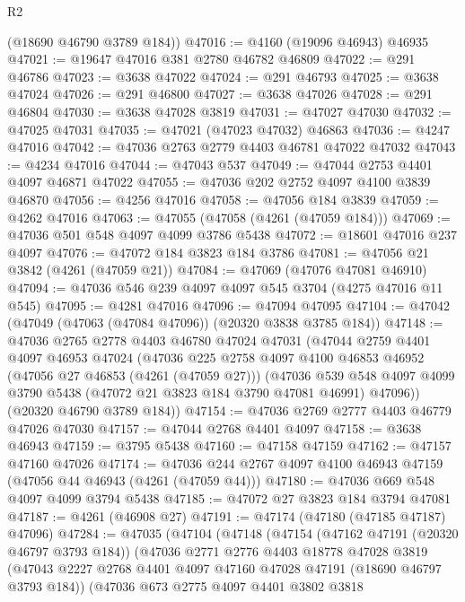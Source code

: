 \begin{lexlean}{R2}
\begin{coremodule}
      (@18690 @46790 @3789 @184))
@47016 := @4160 (@19096 @46943) @46935
@47021 := @19647 @47016 @381 @2780 @46782 @46809
@47022 := @291 @46786
@47023 := @3638 @47022
@47024 := @291 @46793
@47025 := @3638 @47024
@47026 := @291 @46800
@47027 := @3638 @47026
@47028 := @291 @46804
@47030 := @3638 @47028 @3819
@47031 := @47027 @47030
@47032 := @47025 @47031
@47035 := @47021 (@47023 @47032) @46863
@47036 := @4247 @47016
@47042 := @47036 @2763 @2779 @4403 @46781 @47022 @47032
@47043 := @4234 @47016
@47044 := @47043 @537
@47049 := @47044 @2753 @4401 @4097 @46871 @47022
@47055 := @47036 @202 @2752 @4097 @4100 @3839 @46870
@47056 := @4256 @47016
@47058 := @47056 @184 @3839
@47059 := @4262 @47016
@47063 := @47055 (@47058 (@4261 (@47059 @184)))
@47069 := @47036 @501 @548 @4097 @4099 @3786 @5438
@47072 := @18601 @47016 @237 @4097
@47076 := @47072 @184 @3823 @184 @3786
@47081 := @47056 @21 @3842 (@4261 (@47059 @21))
@47084 := @47069 (@47076 @47081 @46910)
@47094 := @47036 @546 @239 @4097 @4097 @545 @3704 (@4275 @47016 @11 @545)
@47095 := @4281 @47016
@47096 := @47094 @47095
@47104 := @47042 (@47049 (@47063 (@47084 @47096)) (@20320 @3838 @3785 @184))
@47148 := @47036
    @2765
    @2778
    @4403
    @46780
    @47024
    @47031
    (@47044
      @2759
      @4401
      @4097
      @46953
      @47024
      (@47036
        @225
        @2758
        @4097
        @4100
        @46853
        @46952
        (@47056 @27 @46853 (@4261 (@47059 @27)))
        (@47036
          @539
          @548
          @4097
          @4099
          @3790
          @5438
          (@47072 @21 @3823 @184 @3790 @47081 @46991)
          @47096))
      (@20320 @46790 @3789 @184))
@47154 := @47036 @2769 @2777 @4403 @46779 @47026 @47030
@47157 := @47044 @2768 @4401 @4097
@47158 := @3638 @46943
@47159 := @3795 @5438
@47160 := @47158 @47159
@47162 := @47157 @47160 @47026
@47174 := @47036 @244 @2767 @4097 @4100 @46943 @47159 (@47056 @44 @46943 (@4261 (@47059 @44)))
@47180 := @47036 @669 @548 @4097 @4099 @3794 @5438
@47185 := @47072 @27 @3823 @184 @3794 @47081
@47187 := @4261 (@46908 @27)
@47191 := @47174 (@47180 (@47185 @47187) @47096)
@47284 := @47035
    (@47104
      (@47148
        (@47154
          (@47162 @47191 (@20320 @46797 @3793 @184))
          (@47036
            @2771
            @2776
            @4403
            @18778
            @47028
            @3819
            (@47043 @2227 @2768 @4401 @4097 @47160 @47028 @47191 (@18690 @46797 @3793 @184))
            (@47036
              @673
              @2775
              @4097
              @4401
              @3802
              @3818

\end{coremodule}
\end{lexlean}

